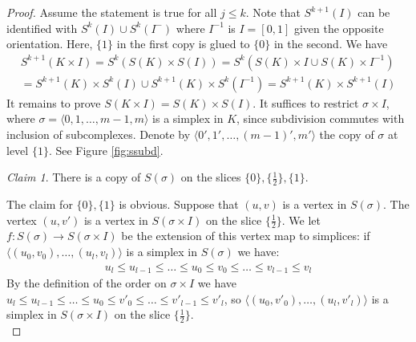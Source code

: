 \documentclass[a4paper,11pt]{article}
\theoremstyle{definition}
\theoremstyle{plain}
\theoremstyle{remark}
\newtheorem*{claim}{Claim}
\begin{document}
\begin{proof} Assume the statement is true for all $j\leq k$. Note that $S^{k+1}(I)$ can be identified with $S^{k}(I)\cup S^{k}(I^{-})$ where $I^{-1}$ is $I=[0,1]$ given the opposite orientation. Here, $\{1\}$ in the first copy is glued to $\{0\}$ in the second. We have 
\begin{align*}
S^{k+1}(K\times I) = S^{k} (S(K) \times S(I)) = S^{k}(S(K) \times I \cup S(K) \times I^{-1})\\
= S^{k+1}(K) \times S^{k}(I) \cup S^{k+1}(K) \times S^k(I^{-1})  = S^{k+1}(K) \times S^{k+1}(I)
\end{align*}
It remains to prove $S(K\times I) = S(K) \times S(I)$. It suffices to restrict  $\sigma \times I$, where $\sigma = \langle 0,1,\dots, m-1, m\rangle$ is a simplex in $K$, since subdivision commutes with inclusion of subcomplexes. Denote by $\langle 0',1',\dots, (m-1)',m'\rangle$ the copy of $\sigma$ at level $\{1\}$. See Figure \ref{fig:ssubd}.\\

\begin{claim} There is a copy of $S(\sigma)$ on the slices $\{0\},\{\frac{1}{2}\},\{1\}$. 
\end{claim}

The claim for $\{0\},\{1\}$ is obvious. Suppose that $(u,v)$ is a vertex in $S(\sigma)$. The vertex $(u,v')$ is a vertex in $S(\sigma \times I)$ on the slice $\{\frac{1}{2}\}$. We let $f: S(\sigma)\rightarrow S(\sigma \times I)$ be the extension of this vertex map to simplices: if $\langle (u_{0},v_{0}),\dots, (u_{l}, v_{l})\rangle$ is a simplex in $S(\sigma)$ we have:
\begin{align*}
u_{l}\leq u_{l-1}\leq \dots \leq u_{0} \leq v_{0} \leq \dots \leq v_{l-1} \leq v_{l}
\end{align*}
By the definition of the order on $\sigma \times I$ we have $u_{l}\leq u_{l-1}\leq \dots \leq u_{0} \leq v'_{0} \leq \dots \leq v'_{l-1} \leq v'_{l}$, so $\langle (u_{0},v'_{0}),\dots, (u_{l}, v'_{l})\rangle$ is a simplex in $S(\sigma \times I)$ on the slice $\{\frac{1}{2}\}$. \\


\end{proof}
\end{document}
